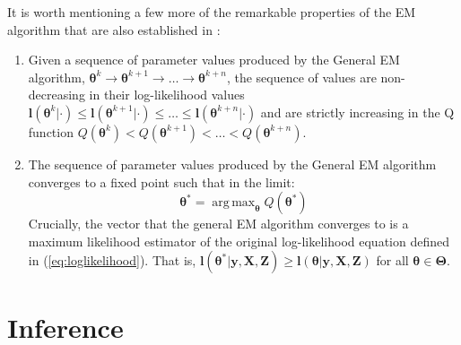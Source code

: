 \documentclass[12pt]{article}
\DeclareMathOperator*{\argmax}{arg\,max}
\begin{document}
\bigskip

It is worth mentioning a few more of the remarkable properties of the EM algorithm
that are also established in \citet{EM_DLR1977}:

\begin{enumerate}
  \item Given a sequence of parameter values produced by the General EM algorithm,
  $\boldsymbol{\theta}^{k} \rightarrow \boldsymbol{\theta}^{k+1} \rightarrow \ldots \rightarrow \boldsymbol{\theta}^{k+n}$,
  the sequence of values are non-decreasing in their log-likelihood values
  $\boldsymbol{l}(\boldsymbol{\theta}^{k}| \cdot) \leq \boldsymbol{l}(\boldsymbol{\theta}^{k+1}| \cdot) \leq \ldots \leq \boldsymbol{l}(\boldsymbol{\theta}^{k+n}| \cdot)$
  and are strictly increasing in the Q function $Q(\boldsymbol{\theta}^{k}) < Q(\boldsymbol{\theta}^{k+1}) < \ldots < Q(\boldsymbol{\theta}^{k+n})$.

  \item The sequence of parameter values produced by the General EM algorithm
  converges to a fixed point such that in the limit:
    \begin{equation}
      \boldsymbol{\theta}^{*}  = \argmax_{\boldsymbol{\theta}} Q(\boldsymbol{\theta}^{*})
    \end{equation}
  Crucially, the vector that the general EM algorithm converges
  to is a maximum likelihood estimator of the original log-likelihood equation
  defined in (\ref{eq:loglikelihood}). That is, 
  $\boldsymbol{l}(\boldsymbol{\theta}^{*}| \boldsymbol{y}, \boldsymbol{X}, \boldsymbol{Z}) \geq \boldsymbol{l}(\boldsymbol{\theta}| \boldsymbol{y}, \boldsymbol{X}, \boldsymbol{Z})$
  for all $\boldsymbol{\theta} \in \boldsymbol{\Theta}$.
\end{enumerate}

\section{Inference} \label{sec:Inference}
\end{document}
